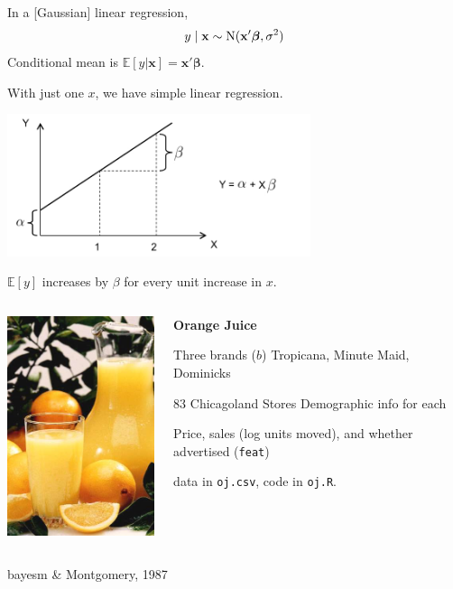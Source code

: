 \documentclass[11pt,xcolor=svgnames]{beamer}
\newcommand{\gr}{\color{gray}}
\newcommand{\nv}{\color{Navy}}
\newcommand{\bs}[1]{\boldsymbol{#1}}
\newcommand{\mr}[1]{\mathrm{#1}}
\newcommand{\bm}[1]{\mathbf{#1}}
\newcommand{\ds}[1]{\mathds{#1}}
\newcommand{\sk}{\vspace{.5cm}}
\begin{document}
\begin{frame}


In a [Gaussian] linear regression,
\vspace{-.25cm}
{\large\[\vspace{-.25cm}
y \mid \bm{x} \sim \mr{N}(
\bm{x}'\bs{\beta}, \sigma^2)
\]}
{\gr Conditional mean is $\ds{E}[y |\bm{x} ] = 
\bm{x}'\bs{\beta}$.}

\begin{center}
With just one $x$, we have simple linear regression.

\sk
\hfill\includegraphics[width=3.5in]{../graphs/linreg}

$\ds{E}[ y ]$ increases by $\beta$ for every unit increase in $x$.
\end{center}
\vskip -1cm
\end{frame}


\begin{frame}


\sk
\begin{columns}[c] 
\column{2in} 
\includegraphics[width=2in]{../graphs/orange-juice}
\column{2in}\small 
\begin{center}

\vskip -1cm
{\bf \Large Orange Juice}

\sk
Three brands ($b$)
{\nv Tropicana, Minute Maid, Dominicks }


\sk 
83 Chicagoland Stores
{\gr Demographic info for each}

\sk
Price, sales (log units moved),  and
whether advertised ({\tt feat}) 

\sk
data in {\tt oj.csv}, code in {\tt oj.R}.
\end{center}

\end{columns} 
\hfill \footnotesize \gr bayesm \& Montgomery, 1987 

\end{frame}
\end{document}
